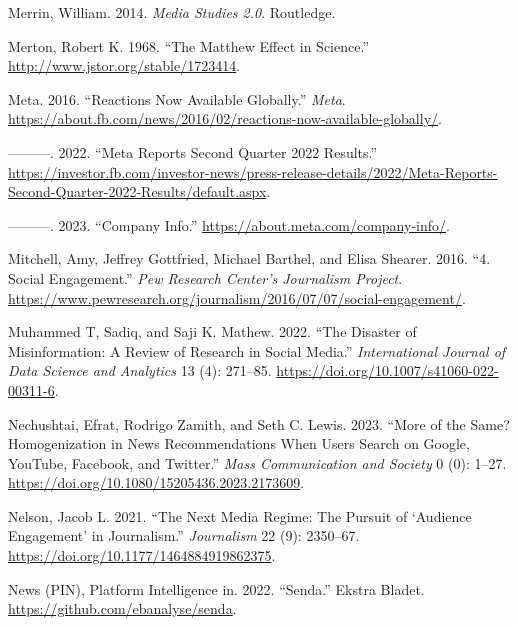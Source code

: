 \documentclass[
]{article}
\newlength{\cslhangindent}
\newlength{\cslentryspacingunit} %
\newenvironment{CSLReferences}[2] %
 {%
  \setlength{\parindent}{0pt}
  \ifodd #1
  \let\oldpar\par
  \def\par{\hangindent=\cslhangindent\oldpar}
  \fi
  \setlength{\parskip}{#2\cslentryspacingunit}
 }%
 {}
\begin{document}
\begin{CSLReferences}{1}{0}
\leavevmode{}%
Merrin, William. 2014. \emph{Media {Studies} 2.0}. Routledge.

\leavevmode{}%
Merton, Robert K. 1968. {``The {Matthew} {Effect} in {Science}.''}
\url{http://www.jstor.org/stable/1723414}.

\leavevmode{}%
Meta. 2016. {``Reactions {Now} {Available} {Globally}.''} \emph{Meta}.
\url{https://about.fb.com/news/2016/02/reactions-now-available-globally/}.

\leavevmode{}%
---------. 2022. {``Meta {Reports} {Second} {Quarter} 2022 {Results}.''}
\url{https://investor.fb.com/investor-news/press-release-details/2022/Meta-Reports-Second-Quarter-2022-Results/default.aspx}.

\leavevmode{}%
---------. 2023. {``Company {Info}.''}
\url{https://about.meta.com/company-info/}.

\leavevmode{}%
Mitchell, Amy, Jeffrey Gottfried, Michael Barthel, and Elisa Shearer.
2016. {``4. {Social} Engagement.''} \emph{Pew Research Center's
Journalism Project}.
\url{https://www.pewresearch.org/journalism/2016/07/07/social-engagement/}.

\leavevmode{}%
Muhammed T, Sadiq, and Saji K. Mathew. 2022. {``The Disaster of
Misinformation: A Review of Research in Social Media.''}
\emph{International Journal of Data Science and Analytics} 13 (4):
271--85. \url{https://doi.org/10.1007/s41060-022-00311-6}.

\leavevmode{}%
Nechushtai, Efrat, Rodrigo Zamith, and Seth C. Lewis. 2023. {``More of
the {Same}? {Homogenization} in {News} {Recommendations} {When} {Users}
{Search} on {Google}, {YouTube}, {Facebook}, and {Twitter}.''}
\emph{Mass Communication and Society} 0 (0): 1--27.
\url{https://doi.org/10.1080/15205436.2023.2173609}.

\leavevmode{}%
Nelson, Jacob L. 2021. {``The Next Media Regime: {The} Pursuit of
{`Audience Engagement'} in Journalism.''} \emph{Journalism} 22 (9):
2350--67. \url{https://doi.org/10.1177/1464884919862375}.

\leavevmode{}%
News (PIN), Platform Intelligence in. 2022. {``Senda.''} Ekstra Bladet.
\url{https://github.com/ebanalyse/senda}.


\end{CSLReferences}
\end{document}
